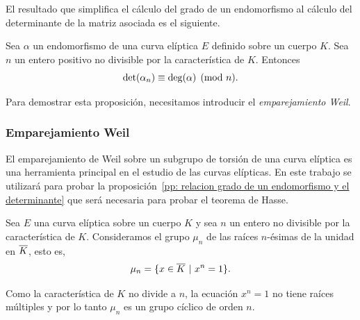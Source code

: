 El resultado que simplifica el cálculo del grado de un endomorfismo al cálculo del determinante de la matriz asociada es el siguiente.

\begin{proposicion}\label{pp: relacion grado de un endomorfismo y el determinante}
	Sea $\alpha$ un endomorfismo de una curva elíptica $E$ definido sobre un cuerpo $K$. Sea $n$ un entero positivo no divisible por la característica de $K$. Entonces
	$$
		\det(\alpha_n) \equiv \deg(\alpha) \pmod{n}.
	$$
\end{proposicion}

Para demostrar esta proposición, necesitamos introducir el \emph{emparejamiento Weil}.

\subsubsection{Emparejamiento Weil}
\label{subs:Emparejamiento Weil}

El emparejamiento de Weil sobre un subgrupo de torsión de una curva elíptica es una herramienta principal en el estudio de las curvas elípticas. En este trabajo se utilizará para probar la proposición~\ref{pp: relacion grado de un endomorfismo y el determinante} que será necesaria para probar el teorema de Hasse.

Sea $E$ una curva elíptica sobre un cuerpo $K$ y sea $n$ un entero no divisible por la característica de $K$. Consideramos el grupo $\mu_n$ de las raíces $n$-ésimas de la unidad en $\overline{K}$, esto es,
$$
	\mu_n = \{ x \in \overline{K} \ | \ x^n = 1 \}.
$$

Como la característica de $K$ no divide a $n$, la ecuación $x^n = 1$ no tiene raíces múltiples y por lo tanto $\mu_n$ es un grupo cíclico de orden $n$.

